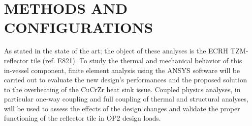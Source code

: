 \chapter{METHODS AND CONFIGURATIONS}
\normalsize{As stated in the state of the art; the object of these analyses is the \acrshort{ECRH} TZM-reflector tile (ref. E821). To study the thermal and mechanical behavior of this in-vessel component, finite element analysis using the ANSYS\textsuperscript{\textregistered} software will be carried out to evaluate the new design's performances and the proposed solution to the overheating of the CuCrZr heat sink issue. Coupled physics analyses, in particular one-way coupling and full coupling of thermal and structural analyses, will be used to assess the effects of the design changes and validate the proper functioning of the reflector tile in \acrshort{OP2} design loads.}




